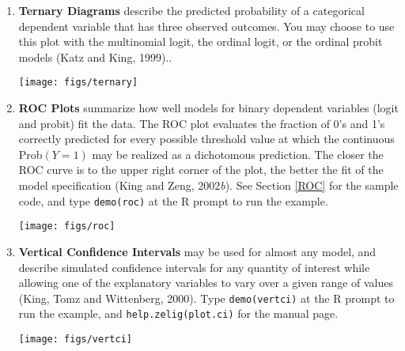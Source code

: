 \begin{enumerate}
  
\item {\bf Ternary Diagrams} describe the predicted probability of a
  categorical dependent variable that has three observed outcomes.
  You may choose to use this plot with the multinomial logit, the
  ordinal logit, or the ordinal probit models (Katz and King,
  1999).\nocite{KatKin99}. 

\begin{center}
\texttt{[image: figs/ternary]}
\end{center}

\newpage

\item {\bf ROC Plots} summarize how well models for binary dependent
  variables (logit and probit) fit the data.  The ROC plot
  evaluates the fraction of 0's and 1's correctly predicted for every
  possible threshold value at which the continuous Prob$(Y = 1)$ may
  be realized as a dichotomous prediction.  The closer the ROC curve
  is to the upper right corner of the plot, the better the fit of the
  model specification (King and Zeng, 2002\emph{b})\nocite{KinZen02}.
  See Section \ref{ROC} for the sample code, and type {\tt demo(roc)} at the
  R prompt to run the example.

\begin{center}
\texttt{[image: figs/roc]}
\end{center}

\newpage

\item {\bf Vertical Confidence Intervals} may be used for almost any
  model, and describe simulated confidence intervals for any quantity
  of interest while allowing one of the explanatory variables to vary
  over a given range of values (King, Tomz and Wittenberg,
  2000)\nocite{KinTomWit00}. Type {\tt demo(vertci)} at the R prompt to
  run the example, and {\tt help.zelig(plot.ci)} for the manual page.

\begin{center}
\texttt{[image: figs/vertci]}
\label{plot.vertci}
\end{center}

\end{enumerate}


